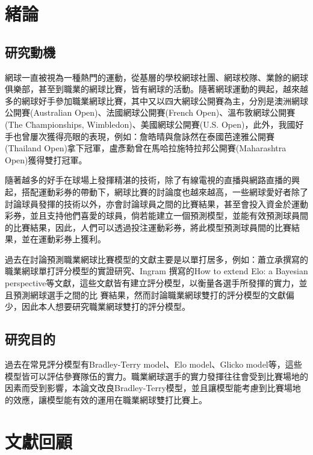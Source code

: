 \documentclass[12pt]{article}
\author{林澤慶}
\begin{document}


\clearpage
\tableofcontents
\clearpage
\listoffigures
\clearpage
\listoftables
\section{緒論}
\subsection{研究動機}

網球一直被視為一種熱門的運動，從基層的學校網球社團、網球校隊、業餘的網球俱樂部，甚至到職業的網球比賽，皆有網球的活動。隨著網球運動的興起，越來越多的網球好手參加職業網球比賽，其中又以四大網球公開賽為主，分別是澳洲網球公開賽(Australian Open)、法國網球公開賽(French Open)、溫布敦網球公開賽(The Championships, Wimbledon)、美國網球公開賽(U.S. Open)，此外，我國好手也曾屢次獲得亮眼的表現，例如：詹皓晴與詹詠然在泰國芭達雅公開賽(Thailand Open)拿下冠軍，盧彥勳曾在馬哈拉施特拉邦公開賽(Maharashtra Open)獲得雙打冠軍。
	
隨著越多的好手在球場上發揮精湛的技術，除了有線電視的直播與網路直播的興起，搭配運動彩券的帶動下，網球比賽的討論度也越來越高，一些網球愛好者除了討論球員發揮的技術以外，亦會討論球員之間的比賽結果，甚至會投入資金於運動彩券，並且支持他們喜愛的球員，倘若能建立一個預測模型，並能有效預測球員間的比賽結果，因此，人們可以透過投注運動彩券，將此模型預測球員間的比賽結果，並在運動彩券上獲利。

過去在討論預測職業網球比賽模型的文獻主要是以單打居多，例如：蕭立承\cite{hsiao2020}撰寫的職業網球單打評分模型的實證研究、Ingram	\cite{Ingram+2021}撰寫的How to extend Elo: a Bayesian perspective等文獻，這些文獻皆有建立評分模型，以衡量各選手所發揮的實力，並且預測網球選手之間的比
賽結果，然而討論職業網球雙打的評分模型的文獻偏少，因此本人想要研究職業網球雙打的評分模型。

\subsection{研究目的}
過去在常見評分模型有Bradley-Terry model\cite{10.2307/2334029}、Elo model\cite{elo1978rating}、Glicko model\cite{alma991021119382005721}等，這些模型皆可以評估參賽隊伍的實力。職業網球選手的實力發揮往往會受到比賽場地的因素而受到影響，本論文改良Bradley-Terry模型，並且讓模型能考慮到比賽場地的效應，讓模型能有效的運用在職業網球雙打比賽上。
\section{文獻回顧}
\end{document}
